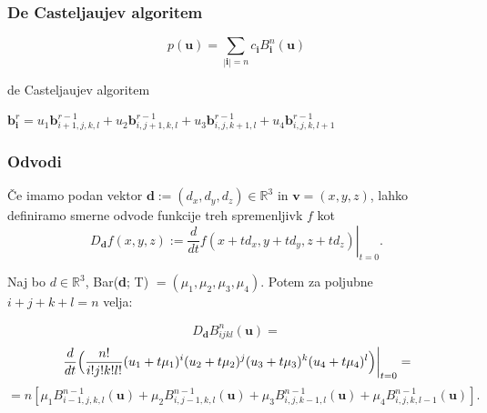 \documentclass[10pt]{beamer}
\theoremstyle{definition}
\begin{document}
\begin{frame}

\frametitle{De Casteljaujev algoritem}
 $$p(\textbf{u}) = \sum_{|\textbf{i}| = n}c_{\textbf{i}}B^{n}_{\textbf{i}}(\textbf{u})$$
 \begin{block}{}
\begin{algorithm}[H]
\caption{de Casteljaujev algoritem}
 	{
		{
			$\textbf{b}^{r}_{\textbf{i}} = u_{1}\textbf{b}^{r-1}_{i+1,j,k,l} + u_{2}\textbf{b}^{r-1}_{i,j+1,k,l} + u_{3}\textbf{b}^{r-1}_{i,j,k+1,l} + u_{4}\textbf{b}^{r-1}_{i,j,k,l+1}$
		}
  	}
\vspace{4mm}
\end{algorithm}
\end{block}
\end{frame}

  \begin{frame}

    \frametitle{Odvodi}
    Če imamo podan vektor $\textbf{d} := (d_x,d_y,d_z) \in \mathbb{R}^3$ in $\textbf{v} = (x, y, z)$, 
    lahko definiramo smerne odvode funkcije treh spremenljivk $f$ kot 
    $$
    \left.D_{\textbf{d}}f(x,y,z):=\frac{d}{dt}f(x+td_x,y+td_y,z+td_z)\right|_{t=0}.
    $$
    \pause
    \begin{block}{}
        Naj bo $d \in \mathbb{R}^{3}$, 
        Bar(\textbf{d}; T) $= (\mu_1,\mu_2,\mu_3,\mu_4)$. Potem za poljubne 
        $i+j+k+l=n$ velja:

        \vspace{0.4cm}

        $$
        D_{\textbf{d}}B_{ijkl}^n(\textbf{u})=
        $$ 
        $$
        \left.\frac{d}{dt}\Bigl(\frac{n!}{i!j!k!l!}(u_{1}+t\mu_{1})^{i}(u_{2}+t\mu_{2})^{j}(u_{3}+t\mu_{3})^{k}(u_{4}+t\mu_{4})^{l}\Bigr)\right|_{t=0}=
        $$
        $$
        = n[\mu_1B_{i-1,j,k,l}^{n-1}(\textbf{u})+
        \mu_2B_{i,j-1,k,l}^{n-1}(\textbf{u})+
        \mu_3B_{i,j,k-1,l}^{n-1}(\textbf{u})+
        \mu_4B_{i,j,k,l-1}^{n-1}(\textbf{u})
        ].
        $$
        \vspace{0.4cm}
    \end{block}

  \end{frame}
\end{document}
